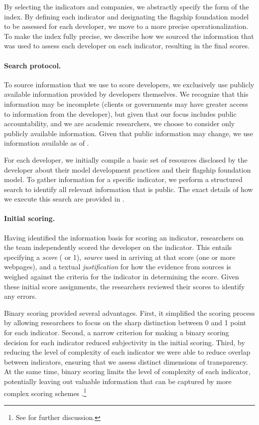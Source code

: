 \documentclass[screen, authorversion, acmsmall]{acmart}
\begin{document}
By selecting the indicators and companies, we abstractly specify the form of the index.
By defining each indicator and designating the flagship foundation model to be assessed for each developer, we move to a more precise operationalization. 
To make the index fully precise, we describe how we sourced the information that was used to assess each developer on each indicator, resulting in the final scores.

\paragraph{Search protocol.}
To source information that we use to score developers, we exclusively use publicly available information provided by developers themselves.
We recognize that this information may be incomplete (\eg clients or governments may have greater access to information from the developer), but given that our focus includes public accountability, and we are academic researchers, we choose to consider only publicly available information.
Given that public information may change, we use information available as of \informationfreezedate.

For each developer, we initially compile a basic set of resources disclosed by the developer about their model development practices and their flagship foundation model.
To gather information for a specific indicator, we perform a structured search to identify all relevant information that is public.
The exact details of how we execute this search are provided in .

\paragraph{Initial scoring.}
Having identified the information basis for scoring an indicator, \numgraders researchers on the team independently scored the developer on the indicator.
This entails specifying a \textit{score} ( or 1), \textit{source} used in arriving at that score (\eg one or more webpages), and a textual \textit{justification} for how the evidence from sources is weighed against the criteria for the indicator in determining the score. 
Given these initial score assignments, the researchers reviewed their scores to identify any errors. 

Binary scoring provided several advantages. First, it simplified the scoring process by allowing researchers to focus on the sharp distinction between 0 and 1 point for each indicator. 
Second, a narrow criterion for making a binary scoring decision for each indicator reduced subjectivity in the initial scoring. 
Third, by reducing the level of complexity of each indicator we were able to reduce overlap between indicators, ensuring that we assess distinct dimensions of transparency.
At the same time, binary scoring limits the level of complexity of each indicator, potentially leaving out valuable information that can be captured by more complex scoring schemes \citep[\cf][]{bommasani2023eu-ai-act}.\footnote{See  for further discussion.}
\end{document}
